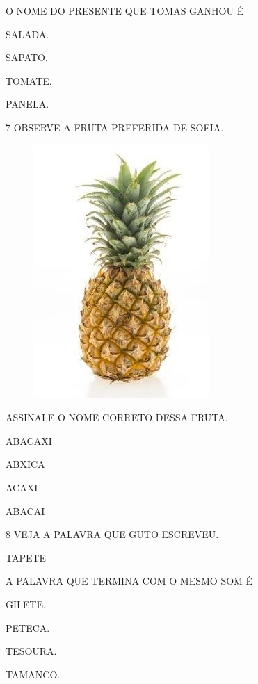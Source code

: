 O NOME DO PRESENTE QUE TOMAS GANHOU É

\begin{escolha}
\item SALADA.

\item SAPATO.

\item TOMATE.

\item PANELA.
\end{escolha}

\num{7} OBSERVE A FRUTA PREFERIDA DE SOFIA.

\begin{figure}[htpb!]
\centering
\includegraphics[width=.2\textwidth]{media/image192.jpg}
\end{figure}

ASSINALE O NOME CORRETO DESSA FRUTA.

\begin{escolha}
\item ABACAXI

\item ABXICA

\item ACAXI

\item ABACAI
\end{escolha}

\pagebreak
\num{8} VEJA A PALAVRA QUE GUTO ESCREVEU.

\begin{myquote}
TAPETE
\end{myquote}

A PALAVRA QUE TERMINA COM O MESMO SOM É

\begin{escolha}
\item GILETE.

\item PETECA.

\item TESOURA.

\item TAMANCO.
\end{escolha}

